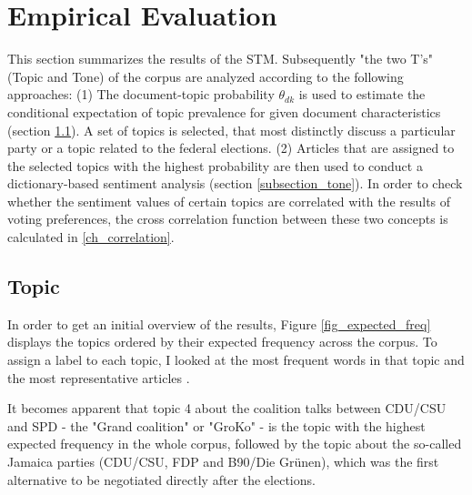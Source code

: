 \documentclass[12pt,a4paper,notitlepage]{article}
\begin{document}
\section{Empirical Evaluation}\label{ch_empirical}

This section summarizes the results of the STM. Subsequently "the two T's" (Topic and Tone) of the corpus are analyzed according to the following approaches: (1) The document-topic probability $\theta_{dk}$ is used to estimate the conditional expectation of topic prevalence for given document characteristics (section \ref{subsection_topic}). A set of topics is selected, that most distinctly discuss a particular party or a topic related to the federal elections. (2) Articles that are assigned to the selected topics with the highest probability are then used to conduct a dictionary-based sentiment analysis (section \ref{subsection_tone}). In order to check whether the sentiment values of certain topics are correlated with the results of voting preferences, the cross correlation function between these two concepts is calculated in \ref{ch_correlation}.

\subsection{Topic}\label{subsection_topic}

In order to get an initial overview of the results, Figure \ref{fig_expected_freq} displays the topics ordered by their expected frequency across the corpus. To assign a label to each topic, I looked at the most frequent words in that topic and the most representative articles \citep{roberts_model_2016}. 

It becomes apparent that topic 4 about the coalition talks between CDU/CSU and SPD - the "Grand coalition" or "GroKo" - is the topic with the highest expected frequency in the whole corpus, followed by the topic about the so-called Jamaica parties (CDU/CSU, FDP and B90/Die Grünen), which was the first alternative to be negotiated directly after the elections.  
\end{document}
